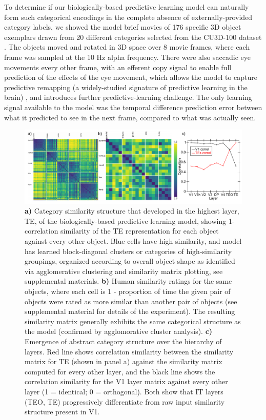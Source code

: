 \documentclass[11pt,twoside]{article}
\newif\myifpdf
\begin{document}
To determine if our biologically-based predictive learning model can naturally form such categorical encodings in the complete absence of externally-provided category labels, we showed the model brief movies of 176 specific 3D object exemplars drawn from 20 different categories selected from the CU3D-100 dataset \cite{OReillyWyatteHerdEtAl13}.  The objects moved and rotated in 3D space over 8 movie frames, where each frame was sampled at the 10 Hz alpha frequency.  There were also saccadic eye movements every other frame, with an efferent copy signal to enable full prediction of the effects of the eye movement, which allows the model to capture predictive remapping (a widely-studied signature of predictive learning in the brain) \cite{DuhamelColbyGoldberg92,CavanaghHuntAfrazEtAl10}, and introduces further predictive-learning challenge.  The only learning signal available to the model was the temporal difference prediction error between what it predicted to see in the next frame, compared to what was actually seen.  

\begin{figure}
  \centering\includegraphics[width=6in]{fig_rsa_leabra_expt1}
  \caption{\small {\bf a)} Category similarity structure that developed in the highest layer, TE, of the biologically-based predictive learning model, showing 1-correlation similarity of the TE representation for each object against every other object. Blue cells have high similarity, and model has learned block-diagonal clusters or categories of high-similarity groupings, organized according to overall object shape as identified via agglomerative clustering and similarity matrix plotting, see supplemental materials. {\bf b)} Human similarity ratings for the same objects, where each cell is 1 - proportion of time the given pair of objects were rated as more similar than another pair of objects (see supplemental material for details of the experiment).  The resulting similarity matrix generally exhibits the same categorical structure as the model (confirmed by agglomorative cluster analysis).  {\bf c)} Emergence of abstract category structure over the hierarchy of layers.  Red line shows correlation similarity between the similarity matrix for TE (shown in panel a) against the similarity matrix computed for every other layer, and the black line shows the correlation similarity for the V1 layer matrix against every other layer (1 = identical; 0 = orthogonal). Both show that IT layers (TEO, TE) progressively differentiate from raw input similarity structure present in V1.}
  \label{fig.rsa}
\end{figure}
\end{document}

